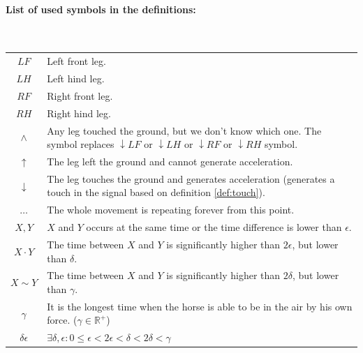 \paragraph{List of used symbols in the definitions:}\quad\\
\begin{tabular}{c|p{.9\linewidth}}
    $LF$                   & Left front leg. \\
    $LH$                   & Left hind leg. \\
    $RF$                   & Right front leg. \\
    $RH$                   & Right hind leg. \\
    $\wedge$               & Any leg touched the ground, but we don't know which one. The symbol replaces $\downarrow LF$ or $\downarrow LH$ or $\downarrow RF$ or $\downarrow RH$ symbol. \\
    $\uparrow$             & The leg left the ground and cannot generate acceleration. \\
    $\downarrow$           & The leg touches the ground and generates acceleration (generates a touch in the signal based on definition \ref{def:touch}). \\
    $\dots$                & The whole movement is repeating forever from this point. \\
    $X, Y$                 & $X$ and $Y$ occurs at the same time or the time difference is lower than $\epsilon$. \\
    $X \cdot Y$            & The time between $X$ and $Y$ is significantly higher than $2\epsilon$, but lower than $\delta$. \\
    $X \sim Y$             & The time between $X$ and $Y$ is significantly higher than $2\delta$, but lower than $\gamma$. \\
    $\gamma$                & It is the longest time when the horse is able to be in the air by his own force. ($\gamma \in \mathbb{R^{+}}$) \\
    $\delta\epsilon$ & $ \exists \delta, \epsilon : 0 \leq \epsilon < 2\epsilon < \delta < 2\delta < \gamma $ \\
\end{tabular}

